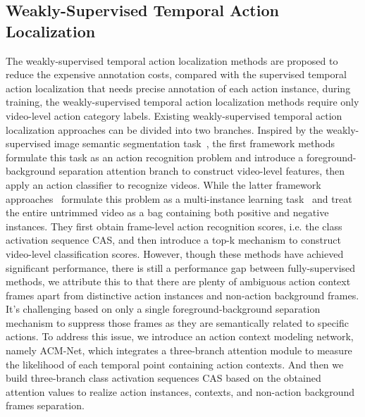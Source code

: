 \documentclass[journal,comsoc]{IEEEtran}
\begin{document}
\subsection{Weakly-Supervised Temporal Action Localization}
\par The weakly-supervised temporal action localization methods are proposed to reduce the expensive annotation costs, compared with the supervised temporal action localization that needs precise annotation of each action instance, during training, the weakly-supervised temporal action localization methods require only video-level action category labels. Existing  weakly-supervised  temporal action localization approaches can be divided into two branches. Inspired by the weakly-supervised image semantic segmentation task~\cite{weakly_seg_1, weakly_seg_2, weakly_seg_3}, the first framework methods~\cite{STPN, A2CLPT, TSM, background_modeling, IWONet} formulate this task as an action recognition problem and introduce a foreground-background separation attention branch to construct video-level features, then apply an action classifier to recognize videos. While the latter framework approaches~\cite{WTALC, MAAN, BASNet, EMMIL} formulate this problem as a multi-instance learning task~\cite{MIL} and treat the entire untrimmed video as a bag containing both positive and negative instances. They first obtain frame-level action recognition scores, i.e. the class activation sequence CAS, and then introduce a top-k  mechanism to construct video-level classification scores. However, though these methods have achieved significant performance, there is still a performance gap between fully-supervised methods, we attribute this to that there are plenty of ambiguous action context frames apart from distinctive action instances and non-action background frames. It's challenging based on only a single foreground-background separation mechanism to suppress those frames as they are semantically related to specific actions. To address this issue, we introduce an action context modeling network, namely ACM-Net, which integrates a three-branch attention module to measure the likelihood of each temporal point containing action contexts. And then we build three-branch class activation sequences CAS based on the obtained attention values to realize action instances, contexts, and non-action background frames separation.
\end{document}
